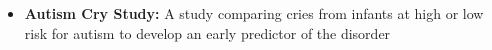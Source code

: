 \documentclass[line,margin,10pt]{res}
\begin{document}
\begin{resume}
\begin{itemize}
	\item \textbf{Autism Cry Study:}  A study comparing cries from infants at high or low risk for autism to develop an early predictor of the disorder
	\end{itemize}
	

\end{resume}
\end{document}
